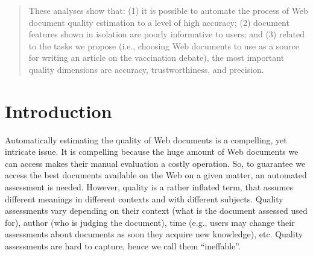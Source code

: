 \documentclass{llncs}
\begin{document}
\begin{abstract}
%
%
%
%
%
%
%
%
These analyses show that: (1) it is possible to automate the process of Web document quality estimation to a level of high accuracy; (2) document features shown in isolation are poorly informative to users; and (3) related to the tasks we propose (i.e., choosing Web documents to use as a source for writing an article on the vaccination debate), the most important quality dimensions are accuracy, trustworthiness, and precision.
\end{abstract}

\section{Introduction}
Automatically estimating the quality of Web documents is a compelling, yet intricate issue. It is compelling because the huge amount of Web documents we can access makes their manual evaluation a costly operation. So, to guarantee we access the best documents available on the Web on a given matter, an automated assessment is needed. 
However, quality is a rather inflated term, that assumes different meanings in different contexts and with different subjects. Quality assessments vary depending on their context (what is the document assessed used for), author (who is judging the document), time (e.g., users may change their assessments about documents as soon they acquire new knowledge), etc. Quality assessments are hard to capture, hence we call them ``ineffable''.
\end{document}

